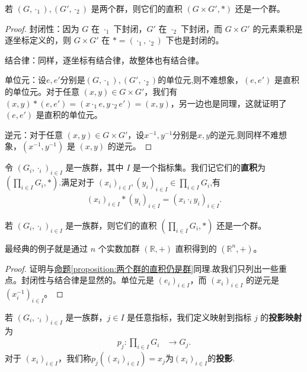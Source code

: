 \documentclass[../../main.tex]{subfiles}
\begin{document}
\begin{proposition}[两个群的直积仍是群]\label{proposition:两个群的直积仍是群}
若 $(G,\cdot_1),(G',\cdot_2)$ 是两个群，则它们的直积 $(G\times G',*)$ 还是一个群。
\end{proposition}
\begin{proof}
封闭性：因为 $G$ 在 $\cdot_1$ 下封闭，$G'$ 在 $\cdot_2$ 下封闭，而 $G\times G'$ 的元素乘积是逐坐标定义的，则 $G\times G'$ 在 $* = (\cdot_1,\cdot_2)$ 下也是封闭的。

结合律：同样，逐坐标有结合律，故整体也有结合律。

单位元：设$e,e'$分别是$(G,\cdot_1),(G',\cdot_2)$的单位元,则不难想象，$(e,e')$ 是直积的单位元。对于任意 $(x,y)\in G\times G'$，我们有 $(x,y)*(e,e')=(x\cdot_1 e,y\cdot_2 e')=(x,y)$，另一边也是同理，这就证明了 $(e,e')$ 是直积的单位元。

逆元：对于任意 $(x,y)\in G\times G'$，设$x^{-1},y^{-1}$分别是$x,y$的逆元,则同样不难想象，$(x^{-1},y^{-1})$ 是 $(x,y)$ 的逆元。 
\end{proof}

\begin{definition}[一族群的直积]
令 $(G_i,\cdot_i)_{i\in I}$ 是一族群，其中 $I$ 是一个指标集。我们记它们的\textbf{直积}为 $(\prod_{i\in I}G_i,*)$.满足对于 $(x_i)_{i\in I},(y_i)_{i\in I}\in\prod_{i\in I}G_i$,有
\begin{align*}
(x_i)_{i\in I}*(y_i)_{i\in I}=(x_i\cdot_i y_i)_{i\in I}.
\end{align*}
\end{definition}

\begin{proposition}[一族群的直积仍是群]
若 $(G_i,\cdot_i)_{i\in I}$ 是一族群，则它们的直积 $(\prod_{i\in I}G_i,*)$ 还是一个群。  
\end{proposition}
\begin{note}
最经典的例子就是通过 $n$ 个实数加群 $(\mathbb{R},+)$ 直积得到的 $(\mathbb{R}^n,+)$。
\end{note}
\begin{proof}
证明与\hyperref[proposition:两个群的直积仍是群]{命题\ref{proposition:两个群的直积仍是群}}同理.故我们只列出一些重点。封闭性与结合律是显然的。单位元是 $(e_i)_{i\in I}$，而 $(x_i)_{i\in I}$ 的逆元是 $(x_i^{-1})_{i\in I}$。 
\end{proof}


\begin{definition}[投影映射]
若 $(G_i,\cdot_i)_{i\in I}$ 是一族群，$j\in I$ 是任意指标，我们定义映射到指标 $j$ 的\textbf{投影映射}为
\begin{align*}
p_j:\prod_{i\in I}G_i&\to G_j.
\end{align*}
对于 $(x_i)_{i\in I}$，我们称$p_j((x_i)_{i\in I})=x_j$为$(x_i)_{i\in I}$的\textbf{投影}.
\end{definition}
\end{document}
